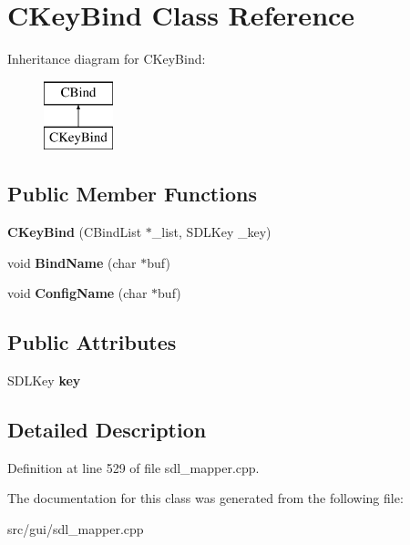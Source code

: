 \hypertarget{classCKeyBind}{\section{C\-Key\-Bind Class Reference}
\label{classCKeyBind}
}
Inheritance diagram for C\-Key\-Bind\-:\begin{figure}[H]
\begin{center}
\leavevmode
\includegraphics[height=2.000000cm]{classCKeyBind}
\end{center}
\end{figure}
\subsection*{Public Member Functions}
\begin{DoxyCompactItemize}
\item 
\hypertarget{classCKeyBind_ace188d08c2721d5f5074cdbd0e52b681}{{\bfseries C\-Key\-Bind} (C\-Bind\-List $\ast$\-\_\-list, S\-D\-L\-Key \-\_\-key)}\label{classCKeyBind_ace188d08c2721d5f5074cdbd0e52b681}

\item 
\hypertarget{classCKeyBind_a35652e64bf1da0c2477e6e235a4d8aec}{void {\bfseries Bind\-Name} (char $\ast$buf)}\label{classCKeyBind_a35652e64bf1da0c2477e6e235a4d8aec}

\item 
\hypertarget{classCKeyBind_a25c924a9b89ff14424899b1779bc70de}{void {\bfseries Config\-Name} (char $\ast$buf)}\label{classCKeyBind_a25c924a9b89ff14424899b1779bc70de}

\end{DoxyCompactItemize}
\subsection*{Public Attributes}
\begin{DoxyCompactItemize}
\item 
\hypertarget{classCKeyBind_a5db2e06f00521cdcd4bdf961cb02c336}{S\-D\-L\-Key {\bfseries key}}\label{classCKeyBind_a5db2e06f00521cdcd4bdf961cb02c336}

\end{DoxyCompactItemize}


\subsection{Detailed Description}


Definition at line 529 of file sdl\-\_\-mapper.\-cpp.



The documentation for this class was generated from the following file\-:\begin{DoxyCompactItemize}
\item 
src/gui/sdl\-\_\-mapper.\-cpp\end{DoxyCompactItemize}
